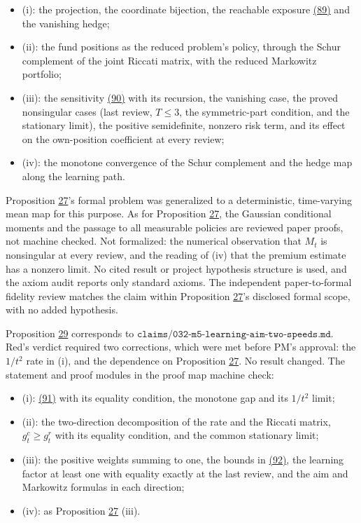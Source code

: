 \documentclass[11pt]{article}
\begin{document}
\begin{itemize}
  \item (i): the projection, the coordinate bijection, the reachable
  exposure \hyperref[eq:89]{(89)} and the vanishing hedge;
  \item (ii): the fund positions as the reduced problem's policy, through
  the Schur complement of the joint Riccati matrix, with the reduced
  Markowitz portfolio;
  \item (iii): the sensitivity \hyperref[eq:90]{(90)} with its recursion, the vanishing case,
  the proved nonsingular cases (last review, \(T\leq3\), the symmetric-part
  condition, and the stationary limit), the positive semidefinite,
  nonzero risk term, and its effect on the own-position coefficient at
  every review;
  \item (iv): the monotone convergence of the Schur complement and the hedge
  map along the learning path.
\end{itemize}

Proposition \hyperref[res:Proposition-27]{27}'s formal problem was generalized to a deterministic,
time-varying mean map for this purpose. As for Proposition \hyperref[res:Proposition-27]{27}, the
Gaussian conditional moments and the passage to all measurable
policies are reviewed paper proofs, not machine checked. Not
formalized: the numerical observation that \(M_t\) is nonsingular at
every review, and the reading of (iv) that the premium estimate has a
nonzero limit. No cited result or project hypothesis structure is
used, and the axiom audit reports only standard axioms. The
independent paper-to-formal fidelity review matches the claim within
Proposition \hyperref[res:Proposition-27]{27}'s disclosed formal scope, with no added hypothesis.

Proposition \hyperref[res:Proposition-29]{29} corresponds to
\(\texttt{claims/032-m5-learning-aim-two-speeds.md}\). Red's verdict
required two corrections, which were met before PM's approval: the
\(1/t^2\) rate in (i), and the dependence on Proposition \hyperref[res:Proposition-27]{27}. No result
changed. The statement and proof modules in the proof map machine
check:

\begin{itemize}
  \item (i): \hyperref[eq:91]{(91)} with its equality condition, the monotone gap and its
  \(1/t^2\) limit;
  \item (ii): the two-direction decomposition of the rate and the Riccati
  matrix, \(g^c_t\geq g^r_t\) with its equality condition, and the common
  stationary limit;
  \item (iii): the positive weights summing to one, the bounds in \hyperref[eq:92]{(92)}, the
  learning factor at least one with equality exactly at the last
  review, and the aim and Markowitz formulas in each direction;
  \item (iv): as Proposition \hyperref[res:Proposition-27]{27} (iii).
\end{itemize}
\end{document}
